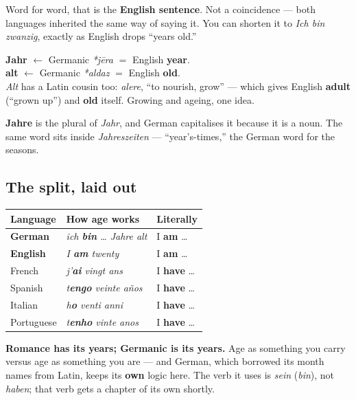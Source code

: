 Word for word, that is the \textbf{English sentence}. Not a coincidence --- both
languages inherited the same way of saying it. You can shorten it to \emph{Ich
bin zwanzig}, exactly as English drops ``years old.''

\begin{cousinweb}
\textbf{Jahr} $\leftarrow$ Germanic \emph{*j\=era} $=$ English \textbf{year}.\\[3pt]
\textbf{alt} $\leftarrow$ Germanic \emph{*aldaz} $=$ English \textbf{old}.\\[3pt]
\emph{Alt} has a Latin cousin too: \emph{alere}, ``to nourish, grow'' --- which
gives English \textbf{adult} (``grown up'') and \textbf{old} itself. Growing and
ageing, one idea.
\end{cousinweb}

\begin{morphologybox}
\textbf{Jahre} is the plural of \emph{Jahr}, and German capitalises it because
it is a noun. The same word sits inside \emph{Jahreszeiten} --- ``year's-times,''
the German word for the seasons.
\end{morphologybox}

\subsection*{The split, laid out}

\begin{center}
\begin{tabular}{@{}lll@{}}
\toprule
Language & How age works & Literally \\
\midrule
\textbf{German} & \emph{ich \textbf{bin} \ldots{} Jahre alt} & I \textbf{am} \ldots{} \\
\textbf{English} & \emph{I \textbf{am} twenty} & I \textbf{am} \ldots{} \\
French & \emph{j'\textbf{ai} vingt ans} & I \textbf{have} \ldots{} \\
Spanish & \emph{t\textbf{engo} veinte a\~{n}os} & I \textbf{have} \ldots{} \\
Italian & \emph{h\textbf{o} venti anni} & I \textbf{have} \ldots{} \\
Portuguese & \emph{t\textbf{enho} vinte anos} & I \textbf{have} \ldots{} \\
\bottomrule
\end{tabular}
\end{center}

\begin{culture}
\textbf{Romance has its years; Germanic is its years.} Age as something you
carry versus age as something you are --- and German, which borrowed its month
names from Latin, keeps its \textbf{own} logic here. The verb it uses is
\emph{sein} (\emph{bin}), not \emph{haben}; that verb gets a chapter of its own
shortly.
\end{culture}
